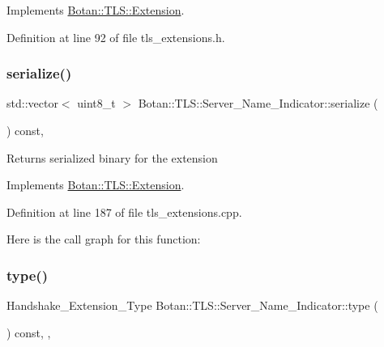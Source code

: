 Implements \mbox{\hyperlink{class_botan_1_1_t_l_s_1_1_extension_aa850b9be2322f94e7c65e583cd51acc5}{Botan\+::\+T\+L\+S\+::\+Extension}}.



Definition at line 92 of file tls\+\_\+extensions.\+h.

\mbox{\label{class_botan_1_1_t_l_s_1_1_server___name___indicator_a0088bcdbfb50c9b2bf13ec3fe1144439}} 
\subsubsection{\texorpdfstring{serialize()}{serialize()}}
{\footnotesize\ttfamily std\+::vector$<$ uint8\+\_\+t $>$ Botan\+::\+T\+L\+S\+::\+Server\+\_\+\+Name\+\_\+\+Indicator\+::serialize (\begin{DoxyParamCaption}{ }\end{DoxyParamCaption}) const\hspace{0.3cm}{\ttfamily [override]}, {\ttfamily [virtual]}}

\begin{DoxyReturn}{Returns}
serialized binary for the extension 
\end{DoxyReturn}


Implements \mbox{\hyperlink{class_botan_1_1_t_l_s_1_1_extension_a56788726ad2526db54e5a26039cb69db}{Botan\+::\+T\+L\+S\+::\+Extension}}.



Definition at line 187 of file tls\+\_\+extensions.\+cpp.

Here is the call graph for this function\+:
\mbox{\label{class_botan_1_1_t_l_s_1_1_server___name___indicator_a3ecbe137658cbab2797a05441e65f42f}} 
\subsubsection{\texorpdfstring{type()}{type()}}
{\footnotesize\ttfamily Handshake\+\_\+\+Extension\+\_\+\+Type Botan\+::\+T\+L\+S\+::\+Server\+\_\+\+Name\+\_\+\+Indicator\+::type (\begin{DoxyParamCaption}{ }\end{DoxyParamCaption}) const\hspace{0.3cm}{\ttfamily [inline]}, {\ttfamily [override]}, {\ttfamily [virtual]}}


